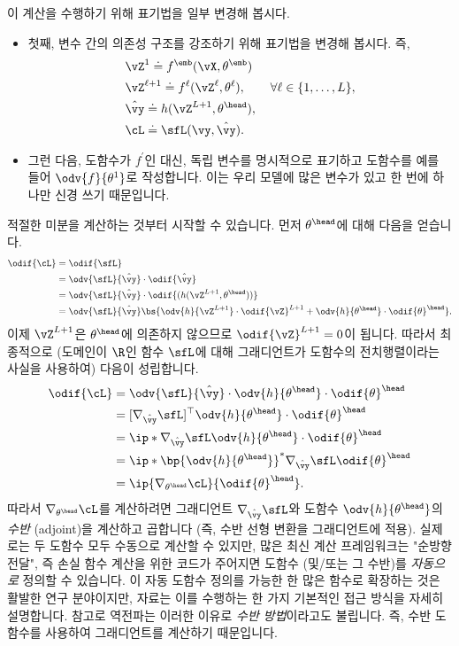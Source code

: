 \documentclass[../../book-main_ko.tex]{subfiles}
\begin{document}
이 계산을 수행하기 위해 표기법을 일부 변경해 봅시다.
\begin{itemize}
    \item 첫째, 변수 간의 의존성 구조를 강조하기 위해 표기법을 변경해 봅시다. 즉,
    \begin{align}
        &\vZ^{1} \doteq f^{\emb}(\vX, \theta^{\emb}) \\
        &\vZ^{\ell + 1} \doteq f^{\ell}(\vZ^{\ell}, \theta^{\ell}), \qquad \forall \ell \in \{1, \dots, L\}, \\
        &\hat{\vy} \doteq h(\vZ^{L+1}, \theta^{\head}), \\
        &\cL \doteq \sfL(\vy, \hat{\vy}).
    \end{align}
    \item 그런 다음, 도함수가 \(f^{\prime}\)인 대신, 독립 변수를 명시적으로 표기하고 도함수를 예를 들어 \(\odv{f}{\theta^{1}}\)로 작성합니다. 이는 우리 모델에 많은 변수가 있고 한 번에 하나만 신경 쓰기 때문입니다.
\end{itemize}
적절한 미분을 계산하는 것부터 시작할 수 있습니다. 먼저 \(\theta^{\head}\)에 대해 다음을 얻습니다.
\begin{align}
    \odif{\cL}
    &= \odif{\sfL} \\
    &= \odv{\sfL}{\hat{\vy}}\cdot\odif{\hat{\vy}} \\
    &= \odv{\sfL}{\hat{\vy}}\cdot\odif{{(h(\vZ^{L + 1}, \theta^{\head}))}} \\
    &= \odv{\sfL}{\hat{\vy}}\bs{\odv{h}{\vZ^{L + 1}}\cdot\odif{\vZ}^{L + 1} + \odv{h}{\theta^{\head}}\cdot\odif{\theta}^{\head}}.
\end{align}
이제 \(\vZ^{L + 1}\)은 \(\theta^{\head}\)에 의존하지 않으므로 \(\odif{\vZ}^{L + 1} = 0\)이 됩니다. 따라서 최종적으로 (도메인이 \(\R\)인 함수 \(\sfL\)에 대해 그래디언트가 도함수의 전치행렬이라는 사실을 사용하여) 다음이 성립합니다.
\begin{align}
    \odif{\cL}
    &= \odv{\sfL}{\hat{\vy}}\cdot\odv{h}{\theta^{\head}}\cdot\odif{\theta}^{\head} \\
    &= [\nabla_{\hat{\vy}}\sfL]^{\top}\odv{h}{\theta^{\head}}\cdot\odif{\theta}^{\head} \\
    &= \ip*{\nabla_{\hat{\vy}}\sfL}{\odv{h}{\theta^{\head}}\cdot\odif{\theta}^{\head}} \\
    &= \ip*{\bp{\odv{h}{\theta^{\head}}}^{*}\nabla_{\hat{\vy}}\sfL}{\odif{\theta}^{\head}} \\
    &= \ip{\nabla_{\theta^{\head}}\cL}{\odif{\theta}^{\head}}.
\end{align}
따라서 \(\nabla_{\theta^{\head}}\cL\)를 계산하려면 그래디언트 \(\nabla_{\hat{\vy}}\sfL\)와 도함수 \(\odv{h}{\theta^{\head}}\)의 \textit{수반} (adjoint)을 계산하고 곱합니다 (즉, 수반 선형 변환을 그래디언트에 적용). 실제로는 두 도함수 모두 수동으로 계산할 수 있지만, 많은 최신 계산 프레임워크는 "순방향 전달", 즉 손실 함수 계산을 위한 코드가 주어지면 도함수 (및/또는 그 수반)를 \textit{자동으로} 정의할 수 있습니다. 이 자동 도함수 정의를 가능한 한 많은 함수로 확장하는 것은 활발한 연구 분야이지만, \cite{bright2025matrix} 자료는 이를 수행하는 한 가지 기본적인 접근 방식을 자세히 설명합니다. 참고로 역전파는 이러한 이유로 \textit{수반 방법}이라고도 불립니다. 즉, 수반 도함수를 사용하여 그래디언트를 계산하기 때문입니다.
\end{document}
